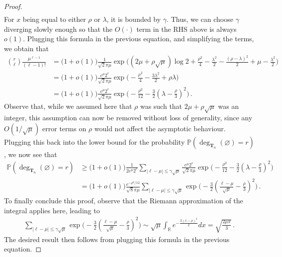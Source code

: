 \documentclass{article}
\newcommand{\pr}{\mathbb{P}}								%
\newcommand{\Prob}[1]{\pr\left(#1\right)}					%
\newcommand{\1}{\mathbbm{1}}								%
\theoremstyle{definition}
\numberwithin{equation}{section}
\newcommand{\R}{\mathbb R}
\begin{document}
\begin{proof}
\begin{align*}
    \end{align*}
    For $x$ being equal to either $\rho$ or $\lambda$, it is bounded by $\gamma$. Thus, we can choose $\gamma$ diverging slowly enough so that the $O(\cdot)$ term in the RHS above is always $o(1)$.
    Plugging this formula in the previous equation, and simplifying the terms, we obtain that
    \begin{align*}
        \binom{r}{\ell}\frac{\mu^{\ell-1}}{(\ell-1)!}
        &=\big(1+o(1)\big)\frac{1}{\sqrt{2}\pi\mu}\exp\Bigg((2\mu+\rho\sqrt{\mu})\log2+\frac{\rho^2}{4}-\frac{\lambda^2}{2}-\frac{(\rho-\lambda)^2}{2}+\mu-\frac{\lambda^2}{2}\Bigg)\\
        &=\big(1+o(1)\big)\frac{e^\mu2^r}{\sqrt{2}\pi\mu}\exp\Bigg(-\frac{\rho^2}{4}-\frac{3\lambda^2}{2}+\rho\lambda\Bigg)\\
        &=\big(1+o(1)\big)\frac{e^\mu2^r}{\sqrt{2}\pi\mu}\exp\Bigg(-\frac{\rho^2}{12}-\frac{3}{2}\left(\lambda-\frac{\rho}{3}\right)^2\Bigg)\,.
    \end{align*}
    Observe that, while we assumed here that $\rho$ was such that $2\mu+\rho\sqrt{\mu}$ was an integer, this assumption can now be removed without loss of generality, since any $O(1/\sqrt{\mu})$ error terms on $\rho$ would not affect the asymptotic behaviour.
    Plugging this back into the lower bound for the probability $\Prob{\deg_{\mathbf{T}_n}(\varnothing)=r}$, we now see that
    \begin{align*}
        \Prob{\deg_{\mathbf{T}_n}(\varnothing)=r}
        &\geq\big(1+o(1)\big)\frac{1}{2e^\mu2^r}\sum_{|\ell-\mu|\leq\gamma\sqrt{\mu}}\frac{e^\mu2^r}{\sqrt{2}\pi\mu}\exp\Bigg(-\frac{\rho^2}{12}-\frac{3}{2}\left(\lambda-\frac{\rho}{3}\right)^2\Bigg)\\
        &=\big(1+o(1)\big)\frac{e^{-\rho^2/12}}{\sqrt{8}\pi\mu}\sum_{|\ell-\mu|\leq\gamma\sqrt{\mu}}\exp\Bigg(-\frac{3}{2}\left(\frac{\ell-\mu}{\sqrt{\mu}}-\frac{\rho}{3}\right)^2\Bigg)\,.
    \end{align*}
    To finally conclude this proof, observe that the Riemann approximation of the integral applies here, leading to
    \begin{align*}
        \sum_{|\ell-\mu|\leq\gamma\sqrt{\mu}}\exp\Bigg(-\frac{3}{2}\left(\frac{\ell-\mu}{\sqrt{\mu}}-\frac{\rho}{3}\right)^2\Bigg)\sim\sqrt{\mu}\int_\R e^{-\frac{3(x-\rho)^2}{2}}dx=\sqrt{\frac{2\mu\pi}{3}}\,.
    \end{align*}
    The desired result then follows from plugging this formula in the previous equation.
\end{proof}
\end{document}
